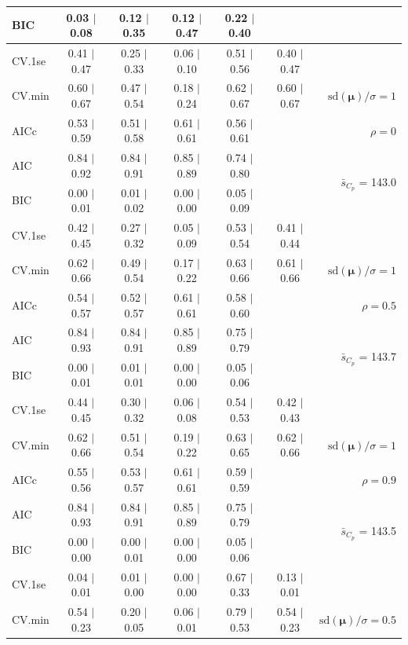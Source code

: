 \documentclass[12pt]{article}
\newcommand{\mr}[1]{\mathrm{#1}}
\newcommand{\bm}[1]{\mathbf{#1}}
\begin{document}
\begin{table}[p]
\begin{center}
\begin{tabular}{l*{5}{c}|r}
BIC & 0.03 $\mid$ 0.08 & 0.12 $\mid$ 0.35 & 0.12 $\mid$ 0.47 & 0.22 $\mid$ 0.40 & & \\
 \hline 
CV.1se & 0.41 $\mid$ 0.47 & 0.25 $\mid$ 0.33 & 0.06 $\mid$ 0.10 & 0.51 $\mid$ 0.56 & 0.40 $\mid$ 0.47 &\\
CV.min & 0.60 $\mid$ 0.67 & 0.47 $\mid$ 0.54 & 0.18 $\mid$ 0.24 & 0.62 $\mid$ 0.67 & 0.60 $\mid$ 0.67 &  $\mr{sd}(\bm{\mu})/\sigma=1$ \\
AICc & 0.53 $\mid$ 0.59 & 0.51 $\mid$ 0.58 & 0.61 $\mid$ 0.61 & 0.56 $\mid$ 0.61 & & $\rho=0$ \\
AIC & 0.84 $\mid$ 0.92 & 0.84 $\mid$ 0.91 & 0.85 $\mid$ 0.89 & 0.74 $\mid$ 0.80 & & \multirow{2}{*}{$\bar{s}_{C_p}$ = 143.0} \\
BIC & 0.00 $\mid$ 0.01 & 0.01 $\mid$ 0.02 & 0.00 $\mid$ 0.00 & 0.05 $\mid$ 0.09 & & \\
 \hline 
CV.1se & 0.42 $\mid$ 0.45 & 0.27 $\mid$ 0.32 & 0.05 $\mid$ 0.09 & 0.53 $\mid$ 0.54 & 0.41 $\mid$ 0.44 &\\
CV.min & 0.62 $\mid$ 0.66 & 0.49 $\mid$ 0.54 & 0.17 $\mid$ 0.22 & 0.63 $\mid$ 0.66 & 0.61 $\mid$ 0.66 &  $\mr{sd}(\bm{\mu})/\sigma=1$ \\
AICc & 0.54 $\mid$ 0.57 & 0.52 $\mid$ 0.57 & 0.61 $\mid$ 0.61 & 0.58 $\mid$ 0.60 & & $\rho=0.5$ \\
AIC & 0.84 $\mid$ 0.93 & 0.84 $\mid$ 0.91 & 0.85 $\mid$ 0.89 & 0.75 $\mid$ 0.79 & & \multirow{2}{*}{$\bar{s}_{C_p}$ = 143.7} \\
BIC & 0.00 $\mid$ 0.01 & 0.01 $\mid$ 0.01 & 0.00 $\mid$ 0.00 & 0.05 $\mid$ 0.06 & & \\
 \hline 
CV.1se & 0.44 $\mid$ 0.45 & 0.30 $\mid$ 0.32 & 0.06 $\mid$ 0.08 & 0.54 $\mid$ 0.53 & 0.42 $\mid$ 0.43 &\\
CV.min & 0.62 $\mid$ 0.66 & 0.51 $\mid$ 0.54 & 0.19 $\mid$ 0.22 & 0.63 $\mid$ 0.65 & 0.62 $\mid$ 0.66 &  $\mr{sd}(\bm{\mu})/\sigma=1$ \\
AICc & 0.55 $\mid$ 0.56 & 0.53 $\mid$ 0.57 & 0.61 $\mid$ 0.61 & 0.59 $\mid$ 0.59 & & $\rho=0.9$ \\
AIC & 0.84 $\mid$ 0.93 & 0.84 $\mid$ 0.91 & 0.85 $\mid$ 0.89 & 0.75 $\mid$ 0.79 & & \multirow{2}{*}{$\bar{s}_{C_p}$ = 143.5} \\
BIC & 0.00 $\mid$ 0.00 & 0.00 $\mid$ 0.01 & 0.00 $\mid$ 0.00 & 0.05 $\mid$ 0.06 & & \\
 \hline 
CV.1se & 0.04 $\mid$ 0.01 & 0.01 $\mid$ 0.00 & 0.00 $\mid$ 0.00 & 0.67 $\mid$ 0.33 & 0.13 $\mid$ 0.01 &\\
CV.min & 0.54 $\mid$ 0.23 & 0.20 $\mid$ 0.05 & 0.06 $\mid$ 0.01 & 0.79 $\mid$ 0.53 & 0.54 $\mid$ 0.23 &  $\mr{sd}(\bm{\mu})/\sigma=0.5$ \\

\end{tabular}
\end{center}
\end{table}
\end{document}
